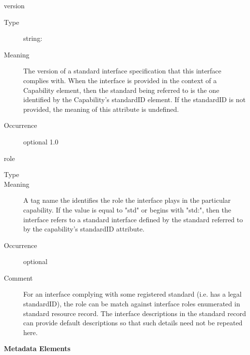 \documentclass[11pt,a4paper]{ivoa}
\begin{document}
\begingroup\small\begin{bigdescription}
\item[version]
\begin{description}
\item[Type] string: 
\item[Meaning] 
               The version of a standard interface specification that this 
               interface complies with.  When the interface is
               provided in the context of a Capability element, then
               the standard being referred to is the one identified by
               the Capability's standardID element.  If the standardID
               is not provided, the meaning of this attribute is
               undefined.  
            
\item[Occurrence] optional
1.0
\end{description}
\item[role]
\begin{description}
\item[Type] 
\item[Meaning] 
               A tag name the identifies the role the interface plays
               in the particular capability.  If the value is equal to
               {"}std{"} or begins with {"}std:{"}, then the interface refers
               to a standard interface defined by the standard
               referred to by the capability's standardID attribute.  
            
\item[Occurrence] optional
\item[Comment] 
               For an interface complying with some registered
               standard (i.e. has a legal standardID), the role can be
               match against interface roles enumerated in standard 
               resource record.  The interface descriptions in
               the standard record can provide default descriptions 
               so that such details need not be repeated here.  
            
\end{description}


\end{bigdescription}\endgroup



\vspace{0.5ex}\noindent\textbf{ Metadata Elements}
\end{document}
